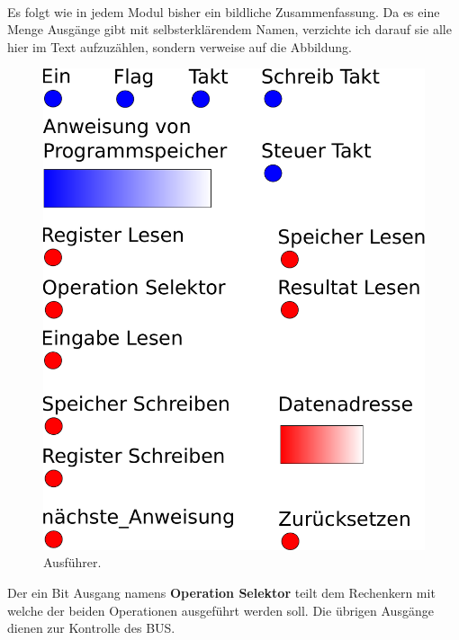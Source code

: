 \documentclass[11pt,a4paper,leqno]{report}
\numberwithin{equation}{chapter}
\begin{document}
\\
Es folgt wie in jedem Modul bisher ein bildliche Zusammenfassung. Da es eine Menge Ausg\"ange gibt mit selbsterkl\"arendem Namen, verzichte ich darauf sie alle hier im Text aufzuz\"ahlen, sondern verweise auf die Abbildung.
\begin{figure}[H]
	\begin{center}
		\includegraphics[scale=0.265]{Bilder/ausfuehrer.pdf}
		\caption{Ausf\"uhrer.}
	\end{center}
\end{figure}
\noindent
Der ein Bit Ausgang namens \textbf{Operation Selektor} teilt dem Rechenkern mit welche der beiden Operationen ausgef\"uhrt werden soll. Die \"ubrigen Ausg\"ange dienen zur Kontrolle des BUS.
\end{document}
